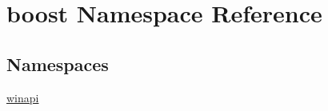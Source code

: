 \hypertarget{namespaceboost}{}\section{boost Namespace Reference}
\label{namespaceboost}
\subsection*{Namespaces}
\begin{DoxyCompactItemize}
\item 
 \mbox{\hyperlink{namespaceboost_1_1winapi}{winapi}}
\end{DoxyCompactItemize}
